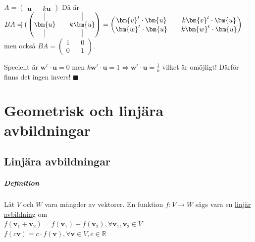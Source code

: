 $A=\begin{pmatrix}\bm{u}&&k\bm{u}\end{pmatrix}$
Då är $BA=\begin{pmatrix}
\end{pmatrix} \cdot 
\begin{pmatrix}
    \vline&&\vline\\
    \bm{u}&&k\bm{u}\\
    \vline&&\vline
\end{pmatrix} =
\begin{pmatrix}
    \bm{v}^{t}\cdot\bm{u} && k\bm{v}^{t}\cdot \bm{u}\\
    \bm{w}^{t}\cdot \bm{u} && k\bm{w}^{t}\cdot \bm{u}
\end{pmatrix}$ 
men också 
$BA=\begin{pmatrix}1&&0\\0&&1\end{pmatrix}$.

Speciellt är  $\bm{w}^{t}\cdot \bm{u}=0$ men $k\bm{w}^{t}\cdot\bm{u}=1\Leftrightarrow \bm{w}^{t}\cdot \bm{u} = \frac{1}{k}$ vilket är omöjligt!
Därför finns det ingen invers! $\blacksquare$

\chapter{Geometrisk och linjära avbildningar}
\section{Linjära avbildningar}

\paragraph{Definition} Låt $V$ och $W$ vara mängder av vektorer.
En funktion $f:V\rightarrow W$ sägs vara en \underline{linjär avbildning} om \\
$f(\bm{v}_{1}+\bm{v}_{2})=f(\bm{v}_{1})+f(\bm{v}_{2}), \forall \bm{v}_{1}, \bm{v}_{2} \in V$\\
$f(c\bm{v})=c\cdot f(\bm{v}), \forall \bm{v}\in V, c\in \mathbb{R}$

